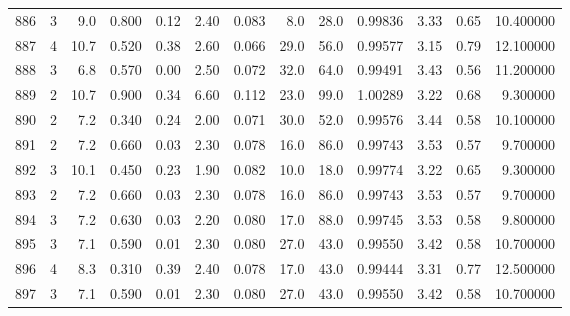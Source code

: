 \begin{tabular}{lrrrrrrrrrrrr}
886  &        3 &            9.0 &             0.800 &         0.12 &            2.40 &      0.083 &                  8.0 &                  28.0 &  0.99836 &  3.33 &       0.65 &  10.400000 \\
887  &        4 &           10.7 &             0.520 &         0.38 &            2.60 &      0.066 &                 29.0 &                  56.0 &  0.99577 &  3.15 &       0.79 &  12.100000 \\
888  &        3 &            6.8 &             0.570 &         0.00 &            2.50 &      0.072 &                 32.0 &                  64.0 &  0.99491 &  3.43 &       0.56 &  11.200000 \\
889  &        2 &           10.7 &             0.900 &         0.34 &            6.60 &      0.112 &                 23.0 &                  99.0 &  1.00289 &  3.22 &       0.68 &   9.300000 \\
890  &        2 &            7.2 &             0.340 &         0.24 &            2.00 &      0.071 &                 30.0 &                  52.0 &  0.99576 &  3.44 &       0.58 &  10.100000 \\
891  &        2 &            7.2 &             0.660 &         0.03 &            2.30 &      0.078 &                 16.0 &                  86.0 &  0.99743 &  3.53 &       0.57 &   9.700000 \\
892  &        3 &           10.1 &             0.450 &         0.23 &            1.90 &      0.082 &                 10.0 &                  18.0 &  0.99774 &  3.22 &       0.65 &   9.300000 \\
893  &        2 &            7.2 &             0.660 &         0.03 &            2.30 &      0.078 &                 16.0 &                  86.0 &  0.99743 &  3.53 &       0.57 &   9.700000 \\
894  &        3 &            7.2 &             0.630 &         0.03 &            2.20 &      0.080 &                 17.0 &                  88.0 &  0.99745 &  3.53 &       0.58 &   9.800000 \\
895  &        3 &            7.1 &             0.590 &         0.01 &            2.30 &      0.080 &                 27.0 &                  43.0 &  0.99550 &  3.42 &       0.58 &  10.700000 \\
896  &        4 &            8.3 &             0.310 &         0.39 &            2.40 &      0.078 &                 17.0 &                  43.0 &  0.99444 &  3.31 &       0.77 &  12.500000 \\
897  &        3 &            7.1 &             0.590 &         0.01 &            2.30 &      0.080 &                 27.0 &                  43.0 &  0.99550 &  3.42 &       0.58 &  10.700000 \\

\end{tabular}

